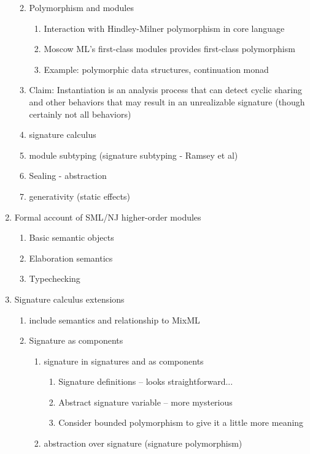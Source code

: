\documentclass[12pt]{article}
\begin{document}
\begin{enumerate}
\begin{enumerate}
\begin{enumerate}
		\end{enumerate}
		\item Polymorphism and modules
		\begin{enumerate}
			\item Interaction with Hindley-Milner polymorphism in core language
			\item Moscow ML's first-class modules provides first-class polymorphism
			\item Example: polymorphic data structures, continuation monad \cite{kahrs94}
		\end{enumerate}
		\item Claim: Instantiation is an analysis process that can detect cyclic sharing and other behaviors that may result in an unrealizable signature (though certainly not all behaviors)
		\item signature calculus
		\item module subtyping (signature subtyping - Ramsey et al)
		\item Sealing - abstraction
		\item generativity (static effects)
	\end{enumerate}
	\item Formal account of SML/NJ higher-order modules
	\begin{enumerate}
		\item Basic semantic objects
		\item Elaboration semantics
		\item Typechecking
	\end{enumerate}
	\item Signature calculus extensions
	\begin{enumerate}
		\item include semantics and relationship to MixML\\
		\item Signature as components
		\begin{enumerate}
			\item signature in signatures and as components
				\begin{enumerate}
					\item Signature definitions -- looks straightforward...
					\item Abstract signature variable -- more mysterious
					\item Consider bounded polymorphism to give it a little more meaning
				\end{enumerate}
			\item abstraction over signature (signature polymorphism)

\end{enumerate}
\end{enumerate}
\end{enumerate}
\end{document}
